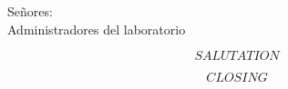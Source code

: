 \documentclass[a4paper,10pt]{letter}
\begin{document}

\begin{letter}{Se\~nores: \\ Administradores del laboratorio}
\address{$$ADDRESS$$}

\opening{$$SALUTATION$$}




\signature{\\$$TITLE$$}

\closing{$$CLOSING$$}


\end{letter}
\end{document}
